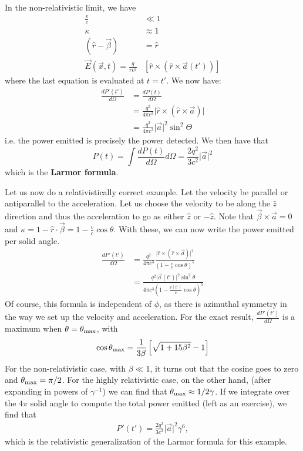 In the non-relativistic limit, we have
\begin{align*}
    \frac{v}{c}&\ll1\\
    \kappa&\approx 1\\
    (\hat{r}-\vec{\beta})&=\hat{r}\\
    \vec{E}(\vec{x}, t)=\frac{q}{rc^2}&\left[ \hat{r}\times\left( \hat{r}\times \vec{a}(t') \right) \right]
\end{align*}
where the last equation is evaluated at $t=t'$. We now have:
\begin{align*}
    \frac{dP'(t')}{d\Omega}&=\frac{dP(t)}{d\Omega}\\
    &=\frac{q^2}{4\pi c^3}\big|\hat{r}\times\left( \hat{r} \times \vec{a} \right)\big|\\
    &=\frac{q^2}{4\pi c^3}\big|\vec{a}\big|^2\sin^2\Theta
\end{align*}
i.e. the power emitted is precisely the power detected. We then have that
\begin{equation*}
    P(t)=\int \frac{dP(t)}{d\Omega} d\Omega=\frac{2q^2}{3c^2}\big|\vec{a}\big|^2
\end{equation*}
which is the \textbf{Larmor formula}.

Let us now do a relativistically correct example. Let the velocity be parallel or antiparallel to the acceleration. Let us choose the velocity to be along the $\hat{z}$ direction and
thus the acceleration to go as either $\hat{z}$ or $-\hat{z}$. Note that $\vec{\beta}\times\vec{a}=0$ and $\kappa=1-\hat{r}\cdot\vec{\beta}=1-\frac{v}{c}\cos\theta$. With these, we can now write the
power emitted per solid angle.
\begin{align*}
    \frac{dP'(t')}{d\Omega}&=\frac{q^2}{4\pi c^3}\frac{\big|\hat{r}\times(\hat{r}\times \vec{a})\big|^2}{\left( 1-\frac{v}{c}\cos\theta \right)^5}\\
    &=\frac{q^2\big|\vec{a}(t')\big|^2\sin^2\theta}{4\pi c^3\left( 1-\frac{v(t')}{c}\cos\theta \right)^5}
\end{align*}
Of course, this formula is independent of $\phi$, as there is azimuthal symmetry in the way we set up the velocity and acceleration.
For the exact result, $\frac{dP'(t')}{d\Omega}$ is a maximum when $\theta=\theta_{\rm max}$, with
\begin{equation*}
    \cos\theta_{\rm max}=\frac{1}{3\beta}\left[ \sqrt{1+15\beta^2}-1 \right]
\end{equation*}
For the non-relativistic case, with $\beta\ll1$, it turns out that the cosine goes to zero and $\theta_{\rm max}=\pi/2$. For the highly relativistic case, on the other hand, (after expanding in powers of
$\gamma^{-1}$) we can find that $\theta_{\rm max}\approx 1/2\gamma$.
If we integrate over the $4\pi$ solid angle to compute the total power emitted (left as an exercise), we find that
\begin{align*}
    P'(t')=\frac{2q^2}{3c^3}\big|\vec{a}\big|^2\gamma^6,
\end{align*}
which is the relativistic generalization of the Larmor formula for this example.

